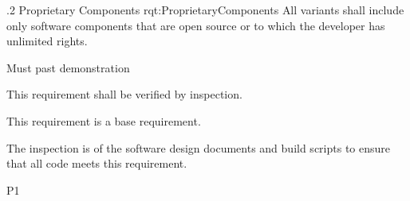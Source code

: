 
\ONERQMTV
{\RqtNumberBase.2}
{Proprietary Components}
{rqt:ProprietaryComponents}
{
All \ThisSystem variants shall include only software components that are open source or to which the developer has unlimited rights.
}
{
	\item [Phase 1] Must past demonstration
}
{This requirement shall be verified by inspection.}
{
	\item [N/A] This requirement is a base requirement.
}
{
	\item The inspection is of the software design documents and build scripts to ensure that all code meets this requirement.
}
{P1}
